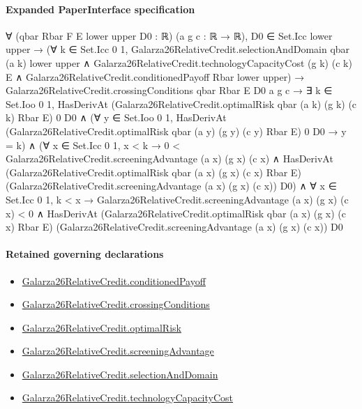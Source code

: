 \documentclass[10pt]{article}
\begin{document}
\paragraph{Expanded PaperInterface specification}
\begin{ReviewVerbatim}
∀ (qbar Rbar F E lower upper D0 : ℝ) (a g c : ℝ → ℝ),
  D0 ∈ Set.Icc lower upper →
    (∀ k ∈ Set.Icc 0 1,
        Galarza26RelativeCredit.selectionAndDomain qbar (a k) lower upper ∧
          Galarza26RelativeCredit.technologyCapacityCost (g k) (c k) E ∧
            Galarza26RelativeCredit.conditionedPayoff Rbar lower upper) →
      Galarza26RelativeCredit.crossingConditions qbar Rbar E D0 a g c →
        ∃ k ∈ Set.Ioo 0 1,
          HasDerivAt (Galarza26RelativeCredit.optimalRisk qbar (a k) (g k) (c k) Rbar E) 0 D0 ∧
            (∀ y ∈ Set.Ioo 0 1,
                HasDerivAt (Galarza26RelativeCredit.optimalRisk qbar (a y) (g y) (c y) Rbar E) 0 D0 → y = k) ∧
              (∀ x ∈ Set.Icc 0 1,
                  x < k →
                    0 < Galarza26RelativeCredit.screeningAdvantage (a x) (g x) (c x) ∧
                      HasDerivAt (Galarza26RelativeCredit.optimalRisk qbar (a x) (g x) (c x) Rbar E)
                        (Galarza26RelativeCredit.screeningAdvantage (a x) (g x) (c x)) D0) ∧
                ∀ x ∈ Set.Icc 0 1,
                  k < x →
                    Galarza26RelativeCredit.screeningAdvantage (a x) (g x) (c x) < 0 ∧
                      HasDerivAt (Galarza26RelativeCredit.optimalRisk qbar (a x) (g x) (c x) Rbar E)
                        (Galarza26RelativeCredit.screeningAdvantage (a x) (g x) (c x)) D0
\end{ReviewVerbatim}

\paragraph{Retained governing declarations}
\begin{itemize}\raggedright
\item \hyperlink{paper-prerequisite-0bf7e0c122a51179}{Galarza26\allowbreak{}Relative\allowbreak{}Credit.\allowbreak{}conditioned\allowbreak{}Payoff}
\item \hyperlink{paper-prerequisite-4f59b48de0be00ac}{Galarza26\allowbreak{}Relative\allowbreak{}Credit.\allowbreak{}crossing\allowbreak{}Conditions}
\item \hyperlink{governing-declaration-e139cf967ddac229}{Galarza26\allowbreak{}Relative\allowbreak{}Credit.\allowbreak{}optimal\allowbreak{}Risk}
\item \hyperlink{paper-prerequisite-29fcb63a4a0578b3}{Galarza26\allowbreak{}Relative\allowbreak{}Credit.\allowbreak{}screening\allowbreak{}Advantage}
\item \hyperlink{paper-prerequisite-ab0e2f9b84884bc6}{Galarza26\allowbreak{}Relative\allowbreak{}Credit.\allowbreak{}selection\allowbreak{}And\allowbreak{}Domain}
\item \hyperlink{paper-prerequisite-e5f9b7ce782f743a}{Galarza26\allowbreak{}Relative\allowbreak{}Credit.\allowbreak{}technology\allowbreak{}Capacity\allowbreak{}Cost}
\end{itemize}
\end{document}
